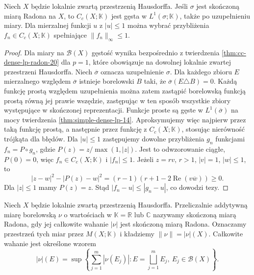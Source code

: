 \begin{lemat}
\label{it:lem:radon-cc-l1}
Niech $X$ będzie lokalnie zwartą przestrzenią Hausdorffa.
Jeśli $\sigma$ jest skończoną miarą Radona na $X$, to
$C_c(X;\mathbb K)$ jest gęsta w $L^1(\sigma;\mathbb K)$,
także po uzupełnieniu miary.
Dla mierzalnej funkcji $u$ z $|u|\le1$ można wybrać
przybliżenia $f_n\in C_c(X;\mathbb K)$ spełniające
$\|f_n\|_\infty\le1$.
\end{lemat}
\begin{proof}
Dla miary na $\mathcal B(X)$ gęstość wynika bezpośrednio
z twierdzenia \ref{thm:cc-dense-lp-radon-20} dla $p=1$,
które obowiązuje na dowolnej lokalnie zwartej przestrzeni
Hausdorffa. Niech $\overline\sigma$ oznacza uzupełnienie $\sigma$.
Dla każdego zbioru $E$ mierzalnego względem $\overline\sigma$
istnieje borelowski $B$ taki, że $\overline\sigma(E\triangle B)=0$.
Każdą funkcję prostą względem uzupełnienia można zatem
zastąpić borelowską funkcją prostą równą jej prawie wszędzie,
zastępując w ten sposób wszystkie zbiory występujące
w skończonej reprezentacji. Funkcje proste są gęste w
$L^1(\overline\sigma)$ na mocy twierdzenia \ref{thm:simple-dense-lp-14}.
Aproksymujemy więc najpierw przez taką funkcję prostą,
a następnie przez funkcję z $C_c(X;\mathbb K)$,
stosując nierówność trójkąta dla błędów.
Dla $|u|\le1$ zastępujemy dowolne przybliżenia $g_n$
funkcjami $f_n=P\circ g_n$, gdzie
$P(z)=z/\max(1,|z|)$.
Jest to odwzorowanie ciągłe, $P(0)=0$, więc
$f_n\in C_c(X;\mathbb K)$ i $|f_n|\le1$.
Jeżeli $z=rv$, $r>1$, $|v|=1$, $|w|\le1$, to
\[
 |z-w|^2-|P(z)-w|^2
 =(r-1)(r+1-2\operatorname{Re}(v\overline w))\ge0.
\]
Dla $|z|\le1$ mamy $P(z)=z$.
Stąd $|f_n-u|\le|g_n-u|$, co dowodzi tezy.
\end{proof}

\begin{definicja}
\label{idx:21:definicja:08}
Niech $X$ będzie lokalnie zwartą przestrzenią Hausdorffa.
Przeliczalnie addytywną miarę borelowską $\nu$ o wartościach
w $\mathbb K=\mathbb R$ lub $\mathbb C$ nazywamy skończoną
miarą Radona, gdy jej całkowite wahanie $|\nu|$ jest
skończoną miarą Radona. Oznaczamy przestrzeń tych miar
przez $M(X;\mathbb K)$ i kładziemy $\|\nu\|=|\nu|(X)$.
Całkowite wahanie jest określone wzorem
\[
 |\nu|(E)=\sup\left\{\sum_{j=1}^m|\nu(E_j)|:
 E=\bigsqcup_{j=1}^m E_j,\ E_j\in\mathcal B(X)\right\}.
\]
\end{definicja}


